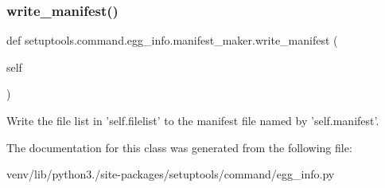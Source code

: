 \subsubsection{\texorpdfstring{write\+\_\+manifest()}{write\_manifest()}}
{\footnotesize\ttfamily def setuptools.\+command.\+egg\+\_\+info.\+manifest\+\_\+maker.\+write\+\_\+manifest (\begin{DoxyParamCaption}\item[{}]{self }\end{DoxyParamCaption})}

\begin{DoxyVerb}Write the file list in 'self.filelist' to the manifest file
named by 'self.manifest'.
\end{DoxyVerb}
 

The documentation for this class was generated from the following file\+:\begin{DoxyCompactItemize}
\item 
venv/lib/python3./site-\/packages/setuptools/command/egg\+\_\+info.\+py\end{DoxyCompactItemize}
